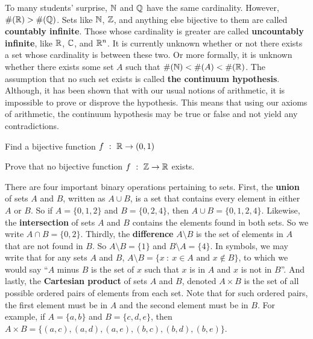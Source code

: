 To many students' surprise, $\mathbb{N}$ and $\mathbb{Q}$ have the same cardinality. However, $\#(\mathbb{R}) > \#(\mathbb{Q})$. Sets like $\mathbb{N}$, $\mathbb{Z}$, and anything else bijective to them are called \textbf{countably infinite}. Those whose cardinality is greater are called \textbf{uncountably infinite}, like $\mathbb{R}$, $\mathbb{C}$, and $\mathbb{R}^n$. It is currently unknown whether or not there exists a set whose cardinality is between these two. Or more formally, it is unknown whether there exists some set $A$ such that $\#(\mathbb{N})<\#(A)<\#(\mathbb{R})$. The assumption that no such set exists is called \textbf{the continuum hypothesis}. Although, it has been shown that with our usual notions of arithmetic, it is impossible to prove or disprove the hypothesis. This means that using our axioms of arithmetic, the continuum hypothesis may be true or false and not yield any contradictions. \\

\begin{exercise}
    Find a bijective function $f\ : \ \mathbb{R} \to (0,1)$
\end{exercise}
\vspace{-5mm}
\begin{exercise}[Challenge]
    Prove that no bijective function $f\ : \ \mathbb{Z} \to \mathbb{R}$ exists.
\end{exercise}

There are four important binary operations pertaining to sets. First, the \textbf{union} of sets $A$ and $B$, written as $A\cup B$, is a set that contains every element in either $A$ or $B$. So if $A=\{0,1,2\}$ and $B=\{0,2,4\}$, then $A\cup B=\{0,1,2,4\}$. Likewise, the \textbf{intersection} of sets $A$ and $B$ contains the elements found in both sets. So we write $A\cap B=\{0,2\}$. Thirdly, the \textbf{difference} $A \setminus B$ is the set of elements in $A$ that are not found in $B$. So $A \setminus B=\{1\}$ and $B \setminus A=\{4\}$. In symbols, we may write that for any sets $A$ and $B$, $A\setminus B=\{x\ :\ x\in A \text{ and } x\notin B\}$, to which we would say ``$A$ minus $B$ is the set of $x$ such that $x$ is in $A$ and $x$ is not in $B$''. And lastly, the \textbf{Cartesian product} of sets $A$ and $B$, denoted $A\times B$ is the set of all possible ordered pairs of elements from each set. Note that for such ordered pairs, the first element must be in $A$ and the second element must be in $B$. For example, if $A=\{a,b\}$ and $B=\{c,d,e\}$, then $A\times B = \{(a,c),(a,d),(a,e),(b,c),(b,d),(b,e)\}$. \\

